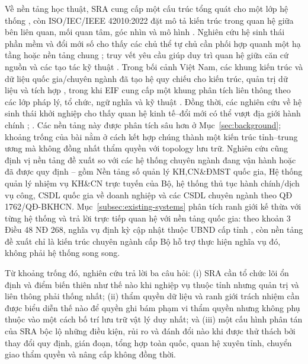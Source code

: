 Về nền tảng học thuật, SRA cung cấp một cấu trúc tổng quát cho một lớp hệ thống \citep{angelov2012}, còn ISO/IEC/IEEE 42010:2022 đặt mô tả kiến trúc trong quan hệ giữa bên liên quan, mối quan tâm, góc nhìn và mô hình \citep{iso42010_2022}. Nghiên cứu hệ sinh thái phần mềm và đổi mới số cho thấy các chủ thể tự chủ cần phối hợp quanh một hạ tầng hoặc nền tảng chung \citep{manikas2013,wang2021}; truy vết yêu cầu giúp duy trì quan hệ giữa căn cứ nguồn và các tạo tác kỹ thuật \citep{winkler2010,kosenkov2025}. Trong bối cảnh Việt Nam, các khung kiến trúc và dữ liệu quốc gia/chuyên ngành đã tạo hệ quy chiếu cho kiến trúc, quản trị dữ liệu và tích hợp \citep{qd3090_2025,qd2439_2025,qd1973_2026}, trong khi EIF cung cấp một khung phân tích liên thông theo các lớp pháp lý, tổ chức, ngữ nghĩa và kỹ thuật \citep[Hình~3, p.~22; pp.~27--30]{eif2017}. Đồng thời, các nghiên cứu về hệ sinh thái khởi nghiệp cho thấy quan hệ kinh tế--đổi mới có thể vượt địa giới hành chính \citep[pp.~27--28]{fischer2022}; \citep[pp.~1483--1484]{noak2025}. Các nền tảng này được phân tích sâu hơn ở Mục~\ref{sec:background}; khoảng trống của bài nằm ở cách kết hợp chúng thành một kiến trúc tỉnh--trung ương mà không đồng nhất thẩm quyền với topology lưu trữ. Nghiên cứu cũng định vị nền tảng đề xuất so với các hệ thống chuyên ngành đang vận hành hoặc đã được quy định -- gồm Nền tảng số quản lý KH,CN\&ĐMST quốc gia, Hệ thống quản lý nhiệm vụ KH\&CN trực tuyến của Bộ, hệ thống thủ tục hành chính/dịch vụ công, CSDL quốc gia về doanh nghiệp và các CSDL chuyên ngành theo QĐ 1762/QĐ-BKHCN. Mục~\ref{subsec:existing-systems} phân tích ranh giới kế thừa với từng hệ thống và trả lời trực tiếp quan hệ với nền tảng quốc gia: theo khoản 3 Điều 48 NĐ 268, nghĩa vụ định kỳ cập nhật thuộc UBND cấp tỉnh \citep{nd268_2025}, còn nền tảng đề xuất chỉ là kiến trúc chuyên ngành cấp Bộ hỗ trợ thực hiện nghĩa vụ đó, không phải hệ thống song song.

Từ khoảng trống đó, nghiên cứu trả lời ba câu hỏi: (i) SRA cần tổ chức lõi ổn định và điểm biến thiên như thế nào khi nghiệp vụ thuộc tỉnh nhưng quản trị và liên thông phải thống nhất; (ii) thẩm quyền dữ liệu và ranh giới trách nhiệm cần được biểu diễn thế nào để quyền ghi bám phạm vi thẩm quyền nhưng không phụ thuộc vào một cách bố trí lưu trữ vật lý duy nhất; và (iii) một cấu hình phân tán của SRA bộc lộ những điều kiện, rủi ro và đánh đổi nào khi được thử thách bởi thay đổi quy định, gián đoạn, tổng hợp toàn quốc, quan hệ xuyên tỉnh, chuyển giao thẩm quyền và nâng cấp không đồng thời.

